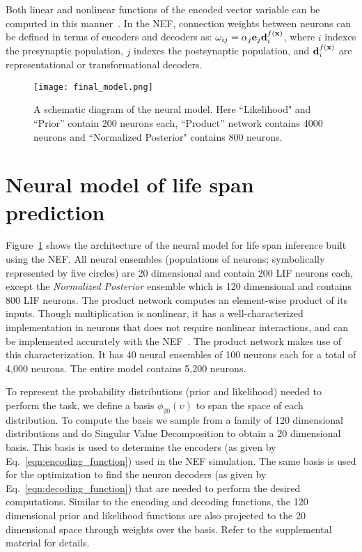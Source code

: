 \documentclass[10pt,letterpaper]{article}
\renewcommand{\vec}[1]{{\bf {#1}}}
\begin{document}
Both linear and nonlinear functions of the encoded vector variable can be computed in this manner~\cite{eliasmith2003neural}. In the NEF, connection weights between neurons can be defined in terms of encoders and decoders as: $\omega_{ij} = \alpha_j \vec{e}_j \vec{d}_i^{f(\vec{x})}$, where $i$ indexes the presynaptic population, $j$ indexes the postsynaptic population, and $\vec{d}_i^{f(\vec{x})}$ are representational or transformational decoders.


\begin{figure}[h]
\begin{center}
\texttt{[image: final\_model.png]}
\end{center}
\caption{A schematic diagram of the neural model. Here ``Likelihood" and ``Prior'' contain 200 neurons each, ``Product'' network contains 4000 neurons and ``Normalized Posterior" contains 800 neurons.}
\label{fig:final_model}
\end{figure}

\section{Neural model of life span prediction}

Figure~\ref{fig:final_model} shows the architecture of the neural model for life span inference built using the NEF. All neural ensembles (populations of neurons; symbolically represented by five circles) are 20 dimensional and contain 200 LIF neurons each, except the \textit{Normalized Posterior} ensemble which is 120 dimensional and contains 800 LIF neurons. The product network computes an element-wise product of its inputs. Though multiplication is nonlinear, it has a well-characterized implementation in neurons that does not require nonlinear interactions, and can be implemented accurately with the NEF~\cite{gosmann2015}. The product network makes use of this characterization. It has 40 neural ensembles of 100 neurons each for a total of 4,000 neurons. The entire model contains 5,200 neurons.

To represent the probability distributions (prior and likelihood) needed to perform the task, we define a basis $\phi_{20}(\upsilon)$ to span the space of each distribution. To compute the basis we sample from a family of 120 dimensional distributions and do Singular Value Decomposition to obtain a 20 dimensional basis. This basis is used to determine the encoders (as given by Eq.~\ref{eqn:encoding_function}) used in the NEF simulation. The same basis is used for the optimization to find the neuron decoders (as given by Eq.~\ref{eqn:decoding_function}) that are needed to perform the desired computations. Similar to the encoding and decoding functions, the 120 dimensional prior and likelihood functions are also projected to the 20 dimensional space through weights over the basis. Refer to the supplemental material for details.  
\end{document}

